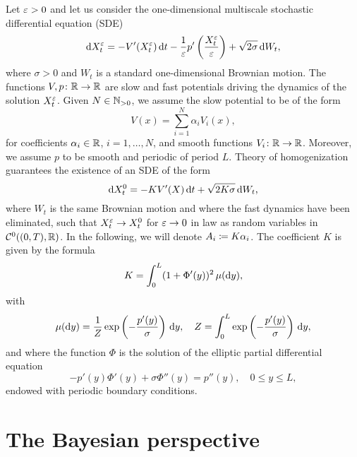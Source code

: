 \documentclass[10pt]{article}
\begin{document}
Let $\varepsilon > 0$ and let us consider the one-dimensional multiscale stochastic differential equation (SDE)
\begin{equation}\label{eq:SDE_MS}
	\mathrm{d} X_t^\varepsilon = -V'(X_t^\varepsilon) \,\mathrm{d} t - \frac1{\varepsilon} p'\left(\frac{X_t^\varepsilon}{\varepsilon}\right) + \sqrt{2\sigma} \,\mathrm{d} W_t,
\end{equation}
where $\sigma > 0$ and $W_t$ is a standard one-dimensional Brownian motion. The functions $V, p\colon \mathbb{R} \to \mathbb{R}$ are slow and fast potentials driving the dynamics of the solution $X_t^\varepsilon$. Given $N \in \mathbb{N}_{>0}$, we assume the slow potential to be of the form
\begin{equation}
	V(x) = \sum_{i=1}^N \alpha_i V_i(x),
\end{equation}
for coefficients $\alpha_i \in \mathbb{R}$, $i = 1, \ldots, N$, and smooth functions $V_i\colon \mathbb{R} \to \mathbb{R}$. Moreover, we assume $p$ to be smooth and periodic of period $L$. Theory of homogenization \cite{BLP78} guarantees the existence of an SDE of the form
\begin{equation}\label{eq:SDE_HOM}
	\mathrm{d} X_t^0 = - K V'(X) \,\mathrm{d} t + \sqrt{2K\sigma} \,\mathrm{d} W_t,
\end{equation}
where $W_t$ is the same Brownian motion and where the fast dynamics have been eliminated, such that $X_t^\varepsilon \to X_t^0$ for $\varepsilon\to 0$ in law as random variables in $\mathcal C^0((0, T), \mathbb{R})$. In the following, we will denote $A_i \coloneqq K\alpha_i$. The coefficient $K$ is given by the formula
\begin{equation}\label{eq:K_HOM}
	K = \int_0^L (1 + \Phi'(y))^2 \, \mu(\mathrm{d} y),
\end{equation}
with 
\begin{equation}
	\mu(\mathrm{d} y) = \frac1Z \exp\left(-\frac{p'(y)}{\sigma}\right) \,\mathrm{d} y, \quad Z = \int_0^L \exp\left(-\frac{p'(y)}{\sigma}\right) \,\mathrm{d} y,
\end{equation}
and where the function $\Phi$ is the solution of the elliptic partial differential equation
\begin{equation}
	-p'(y)\Phi'(y) + \sigma \Phi''(y) = p''(y), \quad 0 \leq y \leq L,
\end{equation}
endowed with periodic boundary conditions.

\section{The Bayesian perspective}
\end{document}
